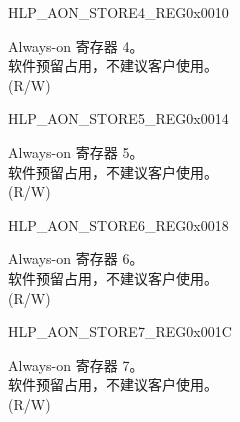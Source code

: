 \begin{register}{H}{LP\_AON\_STORE4\_REG}{0x0010}\label{regdesc:LPAONSTORE4REG}
%
\regnewline%
\begin{regdesc}\begin{reglist}
\label{fielddesc:LPAONLPAONSTORE4}\item [LP\_AON\_LP\_AON\_STORE4] Always-on 寄存器 4。\\
软件预留占用，不建议客户使用。\\
(R/W)
\end{reglist}\end{regdesc}
\end{register}

\begin{register}{H}{LP\_AON\_STORE5\_REG}{0x0014}\label{regdesc:LPAONSTORE5REG}
%
\regnewline%
\begin{regdesc}\begin{reglist}
\label{fielddesc:LPAONLPAONSTORE5}\item [LP\_AON\_LP\_AON\_STORE5] Always-on 寄存器 5。\\
软件预留占用，不建议客户使用。\\
(R/W)
\end{reglist}\end{regdesc}
\end{register}

\begin{register}{H}{LP\_AON\_STORE6\_REG}{0x0018}\label{regdesc:LPAONSTORE6REG}
%
\regnewline%
\begin{regdesc}\begin{reglist}
\label{fielddesc:LPAONLPAONSTORE6}\item [LP\_AON\_LP\_AON\_STORE6] Always-on 寄存器 6。\\
软件预留占用，不建议客户使用。\\
(R/W)
\end{reglist}\end{regdesc}
\end{register}

\begin{register}{H}{LP\_AON\_STORE7\_REG}{0x001C}\label{regdesc:LPAONSTORE7REG}
%
\regnewline%
\begin{regdesc}\begin{reglist}
\label{fielddesc:LPAONLPAONSTORE7}\item [LP\_AON\_LP\_AON\_STORE7] Always-on 寄存器 7。\\
软件预留占用，不建议客户使用。\\
(R/W)
\end{reglist}\end{regdesc}
\end{register}

